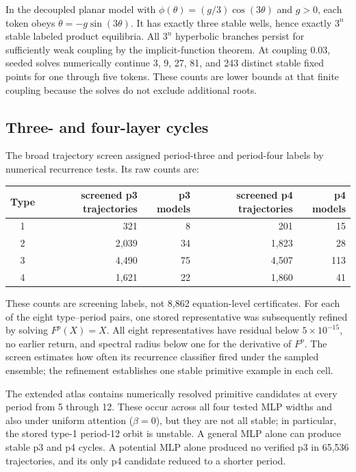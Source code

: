 \documentclass[11pt,a4paper]{article}
\theoremstyle{definition}
\begin{document}
In the decoupled planar model with
$\phi(\theta)=(g/3)\cos(3\theta)$ and $g>0$, each token obeys
$\dot\theta=-g\sin(3\theta)$.  It has exactly three stable wells, hence exactly $3^n$
stable labeled product equilibria.  All $3^n$ hyperbolic branches persist for
sufficiently weak coupling by the implicit-function theorem.  At coupling $0.03$,
seeded solves numerically continue 3, 9, 27, 81, and 243 distinct stable fixed points
for one through five tokens.  These counts are lower bounds at that finite coupling
because the solves do not exclude additional roots.

\subsection{Three- and four-layer cycles}

The broad trajectory screen assigned period-three and period-four labels by numerical
recurrence tests.  Its raw counts are:
\begin{center}
\begin{tabular}{crrrr}
\toprule
Type & screened p3 trajectories & p3 models & screened p4 trajectories & p4 models \\
\midrule
1 & 321 & 8 & 201 & 15 \\
2 & 2,039 & 34 & 1,823 & 28 \\
3 & 4,490 & 75 & 4,507 & 113 \\
4 & 1,621 & 22 & 1,860 & 41 \\
\bottomrule
\end{tabular}
\end{center}

These counts are screening labels, not 8,862 equation-level certificates.  For each
of the eight type--period pairs, one stored representative was subsequently refined by
solving $F^p(X)=X$.  All eight representatives have residual below
$5\times10^{-15}$, no earlier return, and spectral radius below one for the derivative
of $F^p$.  The screen estimates how often its recurrence classifier fired under the
sampled ensemble; the refinement establishes one stable primitive example in each
cell.

The extended atlas contains numerically resolved primitive candidates at every period
from 5 through 12.  These occur across all four tested MLP widths and also under
uniform attention ($\beta=0$), but they are not all stable; in particular, the stored
type-1 period-12 orbit is unstable.  A general MLP alone can produce stable p3 and p4
cycles. A potential MLP alone produced no verified p3 in 65,536 trajectories, and its
only p4 candidate reduced to a shorter period.
\end{document}
